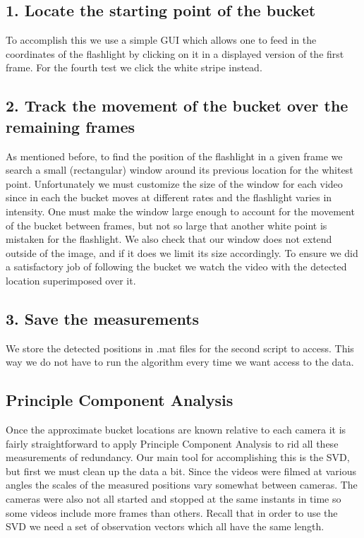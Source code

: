 \documentclass[fleqn,10pt]{../SelfArx} %
\begin{document}
\subsection*{1. Locate the starting point of the bucket}
To accomplish this we use a simple GUI which allows one to feed in the coordinates of the flashlight by clicking on it in a displayed version of the first frame. For the fourth test we click the white stripe instead.

\subsection*{2. Track the movement of the bucket over the remaining frames}
As mentioned before, to find the position of the flashlight in a given frame we search a small (rectangular) window around its previous location for the whitest point. Unfortunately we must customize the size of the window for each video since in each the bucket moves at different rates and the flashlight varies in intensity. One must make the window large enough to account for the movement of the bucket between frames, but not so large that another white point is mistaken for the flashlight. We also check that our window does not extend outside of the image, and if it does we limit its size accordingly. To ensure we did a satisfactory job of following the bucket we watch the video with the detected location superimposed over it.

\subsection*{3. Save the measurements}
We store the detected positions in .mat files for the second script to access. This way we do not have to run the algorithm every time we want access to the data.

\subsection{Principle Component Analysis}
Once the approximate bucket locations are known relative to each camera it is fairly straightforward to apply Principle Component Analysis to rid all these measurements of redundancy. Our main tool for accomplishing this is the SVD, but first we must clean up the data a bit. Since the videos were filmed at various angles the scales of the measured positions vary somewhat between cameras. The cameras were also not all started and stopped at the same instants in time so some videos include more frames than others. Recall that in order to use the SVD we need a set of observation vectors which all have the same length. 
\end{document}
